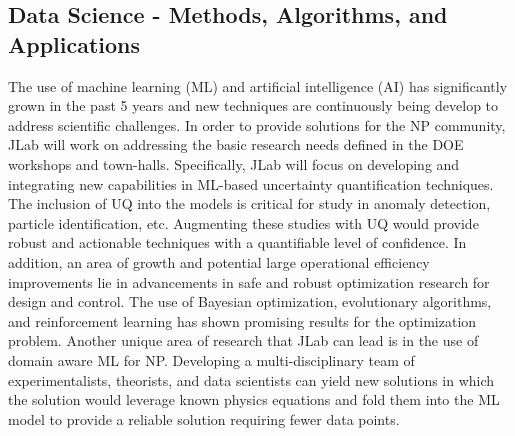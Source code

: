\subsection{Data Science - Methods, Algorithms, and Applications}
The use of machine learning (ML) and artificial intelligence (AI) has significantly grown in the past 5 years and new techniques are continuously being develop to address scientific challenges. In order to provide solutions for the NP community, JLab will work on addressing the basic research needs defined in the DOE workshops and town-halls. 
Specifically, JLab will focus on developing and integrating new capabilities in ML-based uncertainty quantification techniques. The inclusion of UQ into the models is critical for study in anomaly detection, particle identification, etc. Augmenting these studies with UQ would provide robust and actionable techniques with a quantifiable level of confidence. In addition, an area of growth and potential large operational efficiency improvements lie in advancements in safe and robust optimization research for design and control. The use of Bayesian optimization, evolutionary algorithms, and reinforcement learning has shown promising results for the optimization problem. Another unique area of research that JLab can lead is in the use of domain aware ML for NP. Developing a multi-disciplinary team of experimentalists, theorists, and data scientists can yield new solutions in which the solution would leverage known physics equations and fold them into the ML model to provide a reliable solution requiring fewer data points.

